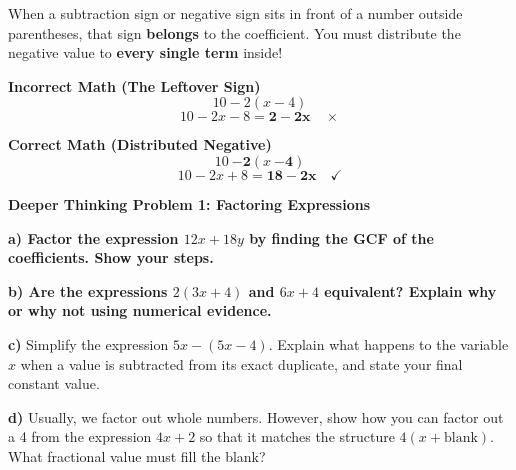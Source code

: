 \documentclass[12pt, letterpaper, fleqn]{article}
\begin{document}
\begin{tcolorbox}[colback=red!5, colframe=red!60!black, boxrule=0.8pt, title=\textbf{STOP! Beware of the Subtraction Chomp}]
\small
When a subtraction sign or negative sign sits in front of a number outside parentheses, that sign \textbf{belongs} to the coefficient. You must distribute the negative value to \textbf{every single term} inside!

\medskip
\begin{minipage}{0.48\textwidth}
\centering
\textbf{\color{red}Incorrect Math (The Leftover Sign)}
$$10 - 2(x - 4)$$
$$10 - 2x - 8 = \mathbf{2 - 2x} \quad \times$$
\end{minipage}
\begin{minipage}{0.48\textwidth}
\centering
\textbf{\color{green!60!black}Correct Math (Distributed Negative)}
$$10 \ \mathbf{- 2}(x \ \mathbf{- 4})$$
$$10 - 2x + 8 = \mathbf{18 - 2x} \quad \checkmark$$
\end{minipage}
\end{tcolorbox}

\vspace{3mm}

\begin{tcolorbox}[colback=white, colframe=black!, boxrule=1pt, arc=4mm, left=6mm, right=6mm, top=5mm, bottom=5mm]
\textbf{Deeper Thinking Problem 1: Factoring Expressions}

\medskip

\noindent
\textbf{a) Factor the expression $12x + 18y$ by finding the GCF of the coefficients. Show your steps.}

\vspace{3cm}

\noindent
\textbf{b) Are the expressions $2(3x + 4)$ and $6x + 4$ equivalent? Explain why or why not using numerical evidence.}

\vspace{4cm}

\noindent
\textbf{c)} Simplify the expression $5x - (5x - 4)$. Explain what happens to the variable $x$ when a value is subtracted from its exact duplicate, and state your final constant value.

\vspace{3cm}

\noindent
\textbf{d)} Usually, we factor out whole numbers. However, show how you can factor out a 4 from the expression $4x + 2$ so that it matches the structure $4(x + \text{blank})$. What fractional value must fill the blank?

\vspace{4cm}
\end{tcolorbox}
\newpage
\end{document}
